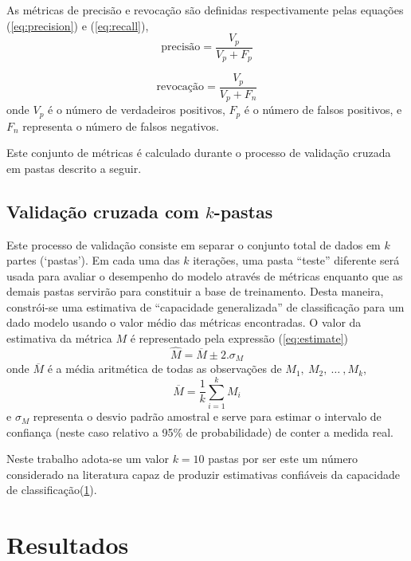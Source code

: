 \documentclass[a4paper,11pt]{article}
\begin{document}
As métricas de precisão e revocação são definidas respectivamente pelas equações 
(\ref{eq:precision}) e (\ref{eq:recall}),
\begin{equation}
 \mbox{precisão} = \frac{V_p}{V_p+F_p}
\label{eq:precision} 
\end{equation}

\begin{equation}
 \mbox{revocação} = \frac{V_p}{V_p+F_n}
\label{eq:recall} 
\end{equation}
onde $V_p$ é o número de verdadeiros positivos, $F_p$ é o número de falsos positivos, e $F_n$ 
representa o número de falsos negativos.

Este conjunto de métricas é calculado durante o processo de validação cruzada em pastas descrito 
a seguir.


\subsection{Validação cruzada com $k$-pastas}

Este processo de validação consiste em separar o conjunto total de dados em $k$ partes (`pastas'). 
Em cada uma das $k$ iterações, uma pasta ``teste'' diferente será usada para avaliar o desempenho 
do modelo através de métricas enquanto que as demais pastas servirão para constituir a base de 
treinamento. Desta maneira, constrói-se uma estimativa de ``capacidade generalizada'' de 
classificação para um dado modelo usando o valor médio das métricas encontradas. O valor da 
estimativa da métrica $M$ é representado pela expressão (\ref{eq:estimate})
\begin{equation}
 \widehat{M} = \overline{M} \pm 2 .\sigma_M
 \label{eq:estimate}
\end{equation}
onde $\overline{M}$ é a média aritmética de todas as observações de $M_1,~M_2,~ \dots~,M_k$, 
$$ \overline{M} = \frac{1}{k}\sum_{i=1}^k M_i$$
e $\sigma_M$ representa o desvio padrão amostral e serve para estimar o intervalo de confiança 
(neste caso relativo a 95\% de probabilidade) de conter a medida real.

Neste trabalho adota-se um valor $k=10$ pastas por ser este um número considerado na literatura 
capaz de produzir estimativas confiáveis da capacidade de classificação(\ref{}).






\section{Resultados}
\end{document}
